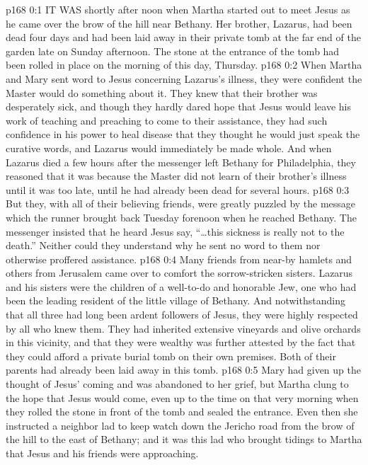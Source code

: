 \vs p168 0:1 IT WAS shortly after noon when Martha started out to meet Jesus as he came over the brow of the hill near Bethany. Her brother, Lazarus, had been dead four days and had been laid away in their private tomb at the far end of the garden late on Sunday afternoon. The stone at the entrance of the tomb had been rolled in place on the morning of this day, Thursday.
\vs p168 0:2 When Martha and Mary sent word to Jesus concerning Lazarus’s illness, they were confident the Master would do something about it. They knew that their brother was desperately sick, and though they hardly dared hope that Jesus would leave his work of teaching and preaching to come to their assistance, they had such confidence in his power to heal disease that they thought he would just speak the curative words, and Lazarus would immediately be made whole. And when Lazarus died a few hours after the messenger left Bethany for Philadelphia, they reasoned that it was because the Master did not learn of their brother’s illness until it was too late, until he had already been dead for several hours.
\vs p168 0:3 But they, with all of their believing friends, were greatly puzzled by the message which the runner brought back Tuesday forenoon when he reached Bethany. The messenger insisted that he heard Jesus say, \textcolor{ubdarkred}{“\ldots this sickness is really not to the death.”} Neither could they understand why he sent no word to them nor otherwise proffered assistance.
\vs p168 0:4 Many friends from near\hyp{}by hamlets and others from Jerusalem came over to comfort the sorrow\hyp{}stricken sisters. Lazarus and his sisters were the children of a well\hyp{}to\hyp{}do and honorable Jew, one who had been the leading resident of the little village of Bethany. And notwithstanding that all three had long been ardent followers of Jesus, they were highly respected by all who knew them. They had inherited extensive vineyards and olive orchards in this vicinity, and that they were wealthy was further attested by the fact that they could afford a private burial tomb on their own premises. Both of their parents had already been laid away in this tomb.
\vs p168 0:5 Mary had given up the thought of Jesus’ coming and was abandoned to her grief, but Martha clung to the hope that Jesus would come, even up to the time on that very morning when they rolled the stone in front of the tomb and sealed the entrance. Even then she instructed a neighbor lad to keep watch down the Jericho road from the brow of the hill to the east of Bethany; and it was this lad who brought tidings to Martha that Jesus and his friends were approaching.
